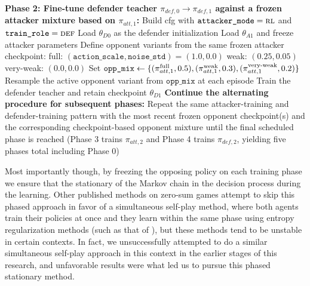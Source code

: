 \begin{algorithm}[H]
\begin{algorithmic}[1]
\State \textbf{Phase 2: Fine-tune defender teacher $\pi_{def,0}\!\rightarrow\!\pi_{def,1}$ against a frozen attacker mixture based on $\pi_{att,1}$:}
\State \hspace{1em} Build cfg with $\texttt{attacker\_mode}=\textsc{rl}$ and $\texttt{train\_role}=\textsc{def}$
\State \hspace{1em} Load $\theta_{D0}$ as the defender initialization
\State \hspace{1em} Load $\theta_{A1}$ and freeze attacker parameters
\State \hspace{1em} Define opponent variants from the same frozen attacker checkpoint:
\Statex \hspace{2em} full: $(\texttt{action\_scale},\texttt{noise\_std})=(1.0,0.0)$
\Statex \hspace{2em} weak: $(0.25,0.05)$
\Statex \hspace{2em} very-weak: $(0.0,0.0)$
\State \hspace{1em} Set
\Statex \hspace{2em}
$\texttt{opp\_mix}\gets\{(\pi_{att,1}^{\text{full}},0.5),(\pi_{att,1}^{\text{weak}},0.3),(\pi_{att,1}^{\text{very\mbox{-}weak}},0.2)\}$
\State \hspace{1em} Resample the active opponent variant from $\texttt{opp\_mix}$ at each episode
\State \hspace{1em} Train the defender teacher and retain checkpoint $\theta_{D1}$
\State \textbf{Continue the alternating procedure for subsequent phases:}
\State \hspace{1em} Repeat the same attacker-training and defender-training pattern with the most recent frozen opponent checkpoint(s) and the corresponding checkpoint-based opponent mixture until the final scheduled phase is reached (Phase 3 trains $\pi_{att,2}$ and Phase 4 trains $\pi_{def,2}$, yielding five phases total including Phase 0)
\end{algorithmic}
\end{algorithm}


Most importantly though, by freezing the opposing policy on each training phase we ensure that the stationary of the Markov chain in the decision process during the learning. Other published methods on zero-sum games attempt to skip this phased approach in favor of a simultaneous self-play method, where both agents train their policies at once and they learn within the same phase using entropy regularization methods (such as that of \cite{rudolph2025reevaluating}), but these methods tend to be unstable in certain contexts. In fact, we unsuccessfully attempted to do a similar simultaneous self-play approach in this context in the earlier stages of this research, and unfavorable results were what led us to pursue this phased stationary method.

